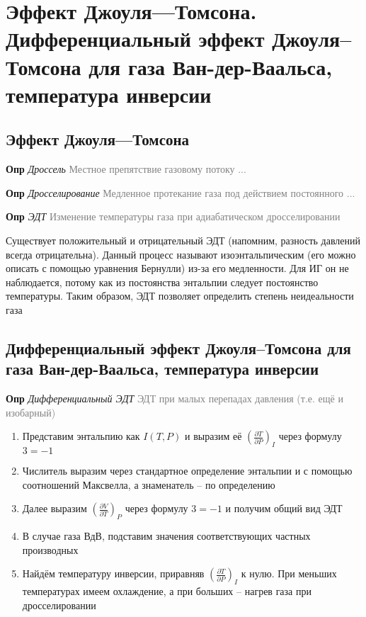 \documentclass[a4paper, 14pt]{article}
\begin{document}
    \section{Эффект Джоуля—Томсона.
    Дифференциальный эффект Джоуля–Томсона для газа Ван-дер-Ваальса, температура инверсии}

    \subsection{Эффект Джоуля—Томсона}

    \textbf{Опр} \textit{Дроссель} \textcolor{gray}{Местное препятствие газовому потоку ...}

    \textbf{Опр} \textit{Дросселирование} \textcolor{gray}{Медленное протекание газа под действием постоянного ...}

    \textbf{Опр} \textit{ЭДТ} \textcolor{gray}{Изменение температуры газа при адиабатическом дросселировании}

    Существует положительный и отрицательный ЭДТ (напомним, разность давлений всегда отрицательна).
    Данный процесс называют изоэнтальпическим (его можно описать с помощью уравнения Бернулли) из-за его медленности.
    Для ИГ он не наблюдается, потому как из постоянства энтальпии следует постоянство температуры.
    Таким образом, ЭДТ позволяет определить степень неидеальности газа

    \subsection{Дифференциальный эффект Джоуля–Томсона для газа Ван-дер-Ваальса, температура инверсии}

    \textbf{Опр} \textit{Дифференциальный ЭДТ} \textcolor{gray}{ЭДТ при малых перепадах давления (т.е. ещё и изобарный)}

    \begin{enumerate}
        \item Представим энтальпию как $I(T, P)$ и выразим её $(\frac{\partial T}{\partial P})_I$ через формулу $3 = -1$
        \item Числитель выразим через стандартное определение энтальпии и с помощью соотношений Максвелла, а
        знаменатель -- по определению
        \item Далее выразим $(\frac{\partial V}{\partial T})_P$ через формулу $3 = -1$ и получим общий вид ЭДТ
        \item В случае газа ВдВ, подставим значения соответствующих частных производных
        \item Найдём температуру инверсии, приравняв $(\frac{\partial T}{\partial P})_I$ к нулю.
        При меньших температурах имеем охлаждение, а при больших -- нагрев газа при дросселировании
    \end{enumerate}
\end{document}
